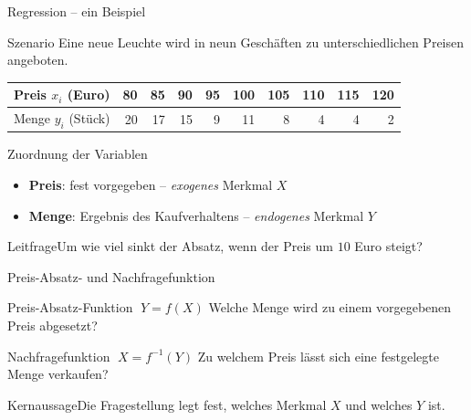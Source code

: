 \documentclass[aspectratio=169,11pt]{beamer}
\newcommand{\kernaussage}[1]{\begin{alertblock}{Kernaussage}#1\end{alertblock}}
\newcommand{\leitfrage}[1]{\begin{exampleblock}{Leitfrage}#1\end{exampleblock}}
\begin{document}



\begin{frame}{Regression -- ein Beispiel}
  \begin{block}{Szenario}
    Eine neue Leuchte wird in neun Geschäften zu unterschiedlichen Preisen angeboten.
  \end{block}

  \medskip

  \begin{center}
    \begin{tabular}{l*{9}{r}}
      \toprule
      Preis $x_i$ (Euro)  & 80 & 85 & 90 & 95 & 100 & 105 & 110 & 115 & 120 \\
      \midrule
      Menge $y_i$ (Stück) & 20 & 17 & 15 & 9  & 11  & 8   & 4   & 4   & 2   \\
      \bottomrule
    \end{tabular}
  \end{center}

  \medskip

  \begin{exampleblock}{Zuordnung der Variablen}
    \begin{itemize}
      \item \textbf{Preis}: fest vorgegeben -- \emph{exogenes} Merkmal $X$
      \item \textbf{Menge}: Ergebnis des Kaufverhaltens -- \emph{endogenes} Merkmal $Y$
    \end{itemize}
  \end{exampleblock}

  \leitfrage{Um wie viel sinkt der Absatz, wenn der Preis um $10$ Euro steigt?}
\end{frame}


\begin{frame}{Preis-Absatz- und Nachfragefunktion}
  \begin{block}{Preis-Absatz-Funktion $\;Y = f(X)$}
    Welche Menge wird zu einem vorgegebenen Preis abgesetzt?
  \end{block}

  \bigskip

  \begin{block}{Nachfragefunktion $\;X = f^{-1}(Y)$}
    Zu welchem Preis lässt sich eine festgelegte Menge verkaufen?
  \end{block}

  \bigskip

  \kernaussage{Die Fragestellung legt fest, welches Merkmal $X$ und welches $Y$ ist.}
\end{frame}
\end{document}
